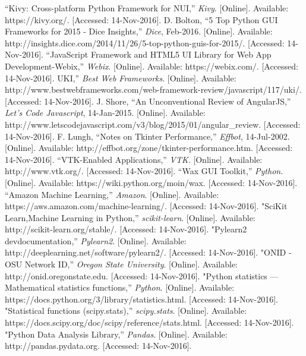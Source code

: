 \documentclass[journal,onecolumn]{IEEEtran}
\begin{document}
%
%
%
\newpage
\begin{thebibliography}{1}

  “Kivy: Cross-platform Python Framework for NUI,” \emph{Kivy}. [Online]. Available: https://kivy.org/. [Accessed: 14-Nov-2016].
 D. Bolton, “5 Top Python GUI Frameworks for 2015 - Dice Insights,” \emph{Dice}, Feb-2016. [Online]. Available: http://insights.dice.com/2014/11/26/5-top-python-guis-for-2015/. [Accessed: 14-Nov-2016]. 
“JavaScript Framework and HTML5 UI Library for Web App Development-Webix,” \emph{Webix}. [Online]. Available: https://webix.com/. [Accessed: 14-Nov-2016]. 
 UKI,” \emph{Best Web Frameworks}. [Online]. Available: http://www.bestwebframeworks.com/web-framework-review/javascript/117/uki/. [Accessed: 14-Nov-2016]. 
J. Shore, “An Unconventional Review of AngularJS,” \emph{Let's Code Javascript}, 14-Jan-2015. [Online]. Available: http://www.letscodejavascript.com/v3/blog/2015/01/angular\_review. [Accessed: 14-Nov-2016]. 
 F. Lungh, “Notes on Tkinter Performance,” \emph{Effbot}, 14-Jul-2002. [Online]. Available: http://effbot.org/zone/tkinter-performance.htm. [Accessed: 14-Nov-2016]. 
 “VTK-Enabled Applications,” \emph{VTK}. [Online]. Available: http://www.vtk.org/. [Accessed: 14-Nov-2016]. 
 “Wax GUI Toolkit,” \emph{Python}. [Online]. Available: https://wiki.python.org/moin/wax. [Accessed: 14-Nov-2016]. 
 “Amazon Machine Learning,” \emph{Amazon}. [Online]. Available: https://aws.amazon.com/machine-learning/. [Accessed: 14-Nov-2016]. 
 "SciKit Learn,Machine Learning in Python,” \emph{scikit-learn}. [Online]. Available: http://scikit-learn.org/stable/. [Accessed: 14-Nov-2016]. 
 "Pylearn2 devdocumentation,” \emph{Pylearn2}. [Online]. Available: http://deeplearning.net/software/pylearn2/. [Accessed: 14-Nov-2016]. 
 "ONID - OSU Network ID,” \emph{Oregon State University}. [Online]. Available: http://onid.oregonstate.edu. [Accessed: 14-Nov-2016]. 
 "Python statistics — Mathematical statistics functions,” \emph{Python}. [Online]. Available: https://docs.python.org/3/library/statistics.html. [Accessed: 14-Nov-2016]. 
 "Statistical functions (scipy.stats),” \emph{scipy.stats}. [Online]. Available: https://docs.scipy.org/doc/scipy/reference/stats.html. [Accessed: 14-Nov-2016]. 
 "Python Data Analysis Library,” \emph{Pandas}. [Online]. Available: http://pandas.pydata.org. [Accessed: 14-Nov-2016]. 


\end{thebibliography}
\end{document}
